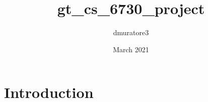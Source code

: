 \documentclass{article}
\title{gt_cs_6730_project}
\author{dmuratore3 }
\date{March 2021}
\begin{document}
\maketitle

\section{Introduction}
\end{document}
